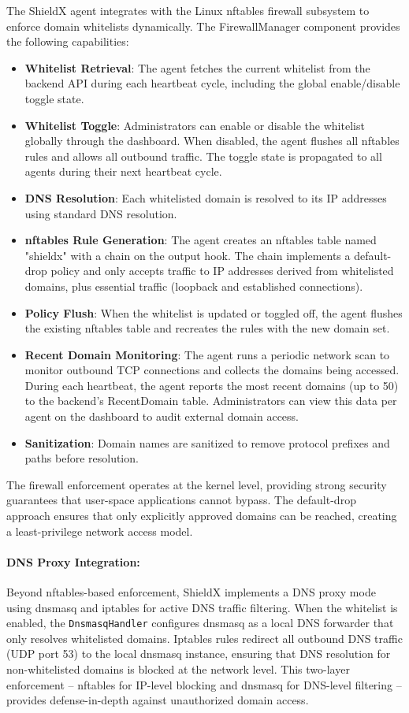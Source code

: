 \documentclass[../Main.tex]{subfiles}
\begin{document}
The ShieldX agent integrates with the Linux nftables firewall subsystem to enforce domain whitelists dynamically. The FirewallManager component provides the following capabilities:

\begin{itemize}
    \item \textbf{Whitelist Retrieval}: The agent fetches the current whitelist from the backend API during each heartbeat cycle, including the global enable/disable toggle state.
    \item \textbf{Whitelist Toggle}: Administrators can enable or disable the whitelist globally through the dashboard. When disabled, the agent flushes all nftables rules and allows all outbound traffic. The toggle state is propagated to all agents during their next heartbeat cycle.
    \item \textbf{DNS Resolution}: Each whitelisted domain is resolved to its IP addresses using standard DNS resolution.
    \item \textbf{nftables Rule Generation}: The agent creates an nftables table named "shieldx" with a chain on the output hook. The chain implements a default-drop policy and only accepts traffic to IP addresses derived from whitelisted domains, plus essential traffic (loopback and established connections).
    \item \textbf{Policy Flush}: When the whitelist is updated or toggled off, the agent flushes the existing nftables table and recreates the rules with the new domain set.
    \item \textbf{Recent Domain Monitoring}: The agent runs a periodic network scan to monitor outbound TCP connections and collects the domains being accessed. During each heartbeat, the agent reports the most recent domains (up to 50) to the backend's RecentDomain table. Administrators can view this data per agent on the dashboard to audit external domain access.
    \item \textbf{Sanitization}: Domain names are sanitized to remove protocol prefixes and paths before resolution.
\end{itemize}

The firewall enforcement operates at the kernel level, providing strong security guarantees that user-space applications cannot bypass. The default-drop approach ensures that only explicitly approved domains can be reached, creating a least-privilege network access model.

\paragraph{DNS Proxy Integration:} Beyond nftables-based enforcement, ShieldX implements a DNS proxy mode using dnsmasq and iptables for active DNS traffic filtering. When the whitelist is enabled, the \texttt{DnsmasqHandler} configures dnsmasq as a local DNS forwarder that only resolves whitelisted domains. Iptables rules redirect all outbound DNS traffic (UDP port 53) to the local dnsmasq instance, ensuring that DNS resolution for non-whitelisted domains is blocked at the network level. This two-layer enforcement -- nftables for IP-level blocking and dnsmasq for DNS-level filtering -- provides defense-in-depth against unauthorized domain access.
\end{document}
